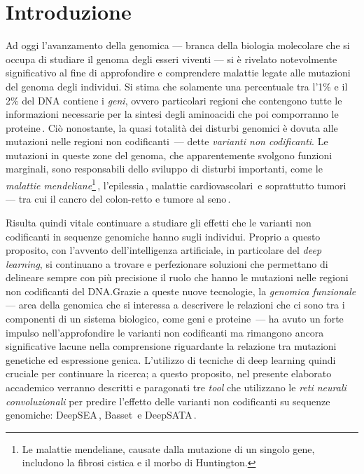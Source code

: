 
\chapter{Introduzione}\label{chp:introduction}

Ad oggi l'avanzamento della genomica — branca della biologia molecolare che si occupa di studiare il genoma degli esseri viventi — si è rivelato notevolmente significativo al fine di approfondire e comprendere malattie legate alle mutazioni del genoma degli individui. Si stima che solamente una percentuale tra l'1\% e il 2\% del DNA contiene i \textsl{geni}, ovvero particolari regioni che contengono tutte le informazioni necessarie per la sintesi degli aminoacidi che poi comporranno le proteine\,\cite{sahu2011identification, pollard2022cell}. Ciò nonostante, la quasi totalità dei disturbi genomici è dovuta alle mutazioni nelle regioni non codificanti\,\cite{zhang2015non} — dette \textsl{varianti non codificanti}. Le mutazioni in queste zone del genoma, che apparentemente svolgono funzioni marginali, sono responsabili dello sviluppo di disturbi importanti, come le \textsl{malattie mendeliane}\footnote{Le malattie mendeliane, causate dalla mutazione di un singolo gene, includono la fibrosi cistica e il morbo di Huntington.}\,\cite{french2020role, chial2008mendelian}, l'epilessia\,\cite{pagni2022non}, malattie cardiovascolari\,\cite{kapoor2014enhancer, zhang2015non} e soprattutto tumori — tra cui il cancro del colon-retto e tumore al seno\,\cite{khurana2016role, tian2019systematic, bojesen2013multiple, michailidou2017association}.

Risulta quindi vitale continuare a studiare gli effetti che le varianti non codificanti in sequenze genomiche hanno sugli individui. Proprio a questo proposito, con l'avvento dell'intelligenza artificiale, in particolare del \textsl{deep learning}, si continuano a trovare e perfezionare soluzioni che permettano di delineare sempre con più precisione il ruolo che hanno le mutazioni nelle regioni non codificanti del DNA.\@ Grazie a queste nuove tecnologie, la \textsl{genomica funzionale} — area della genomica che si interessa a descrivere le relazioni che ci sono tra i componenti di un sistema biologico, come geni e proteine\,\cite{caudai2021ai} — ha avuto un forte impulso nell'approfondire le varianti non codificanti ma rimangono ancora significative lacune nella comprensione riguardante la relazione tra mutazioni genetiche ed espressione genica. L'utilizzo di tecniche di deep learning quindi cruciale per continuare la ricerca; a questo proposito, nel presente elaborato accademico verranno descritti e paragonati tre \textsl{tool} che utilizzano le \textsl{reti neurali convoluzionali} per predire l'effetto delle varianti non codificanti su sequenze genomiche: DeepSEA\,\cite{zhou2015predicting}, Basset\,\cite{kelley2016basset} e DeepSATA\,\cite{ma2023deepsata}.


